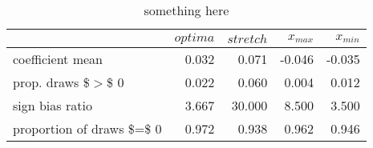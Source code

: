 \begin{table}[ht]
\centering
\begin{tabular}{lrrrr}
  \hline
  & $optima$ & $stretch$ & $x_{max}$ & $x_{min}$ \\ 
  \hline
coefficient mean & 0.032 & 0.071 & -0.046 & -0.035 \\ 
  prop. draws \$$>$\$ 0 & 0.022 & 0.060 & 0.004 & 0.012 \\ 
  sign bias ratio & 3.667 & 30.000 & 8.500 & 3.500 \\ 
  proportion of draws \$=\$ 0 & 0.972 & 0.938 & 0.962 & 0.946 \\ 
   \hline
\end{tabular}
\caption{something here} 
\end{table}
